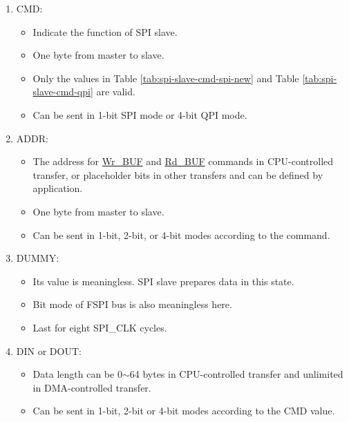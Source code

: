 \documentclass[main\_\_EN.tex]{subfiles}
\begin{document}
\begin{enumerate} 
   \item CMD: 
        \begin{itemize}
            \item Indicate the function of SPI slave. 
            \item One byte from master to slave. 
            \item Only the values in Table \ref{tab:spi-slave-cmd-spi-new} and Table \ref{tab:spi-slave-cmd-qpi} are valid.
            \item Can be sent in 1-bit SPI mode or 4-bit QPI mode.
        \end{itemize}
    
   \item ADDR: 
        \begin{itemize}
            \item The address for \hyperlink{cmd:wrbuf}{Wr\_BUF} and \hyperlink{cmd:rdbuf}{Rd\_BUF} commands in CPU-controlled transfer, or placeholder bits in other transfers and can be defined by application.
            \item One byte from master to slave.
            \item Can be sent in 1-bit, 2-bit, or 4-bit modes according to the command.
        \end{itemize}
      
   \item DUMMY: 
        \begin{itemize}
            \item Its value is meaningless. SPI slave prepares data in this state.
            \item Bit mode of FSPI bus is also meaningless here.
            \item Last for eight SPI\_CLK cycles.
        \end{itemize}
   
   \item DIN or DOUT: 

        \begin{itemize}
            \item Data length can be 0$\sim$64 bytes in CPU-controlled transfer and unlimited in DMA-controlled transfer.
            \item Can be sent in 1-bit, 2-bit or 4-bit modes according to the CMD value.
        \end{itemize}
    
   \end{enumerate}
\end{document}
